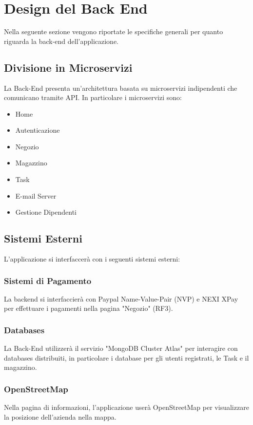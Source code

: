 \documentclass{report}
\begin{document}
\section{Design del Back End}

Nella seguente sezione vengono riportate le specifiche generali per quanto riguarda la back-end dell’applicazione.

\subsection{Divisione in Microservizi}

La Back-End presenta un’architettura basata su microservizi indipendenti che comunicano tramite API. In particolare i microservizi sono:
\begin{itemize}
	\item Home
	\item Autenticazione
	\item Negozio
	\item Magazzino
	\item Task
	\item E-mail Server
	\item Gestione Dipendenti
\end{itemize}

\subsection{Sistemi Esterni}
L’applicazione si interfaccerà con i seguenti sistemi esterni:

\subsubsection{Sistemi di Pagamento}
La backend si interfaccierà con Paypal Name-Value-Pair (NVP) e NEXI XPay per effettuare i pagamenti nella pagina "Negozio" (RF3). 

\subsubsection{Databases}
La Back-End utilizzerà il servizio "MongoDB Cluster Atlas" per interagire con databases distribuiti, in particolare i database per gli utenti registrati, le Task e il magazzino.

\subsubsection{OpenStreetMap}
Nella pagina di informazioni, l'applicazione userà OpenStreetMap per visualizzare la posizione dell'azienda nella mappa.
\end{document}
